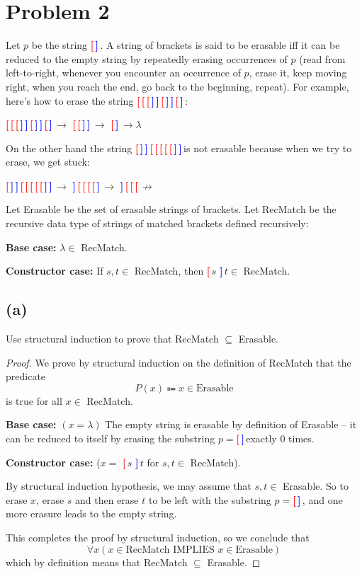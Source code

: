 \documentclass[14pt]{extarticle}
\newcommand{\lbr}{\textcolor{red}{{\bf [\,}}}
\newcommand{\rbr}{\textcolor{blue}{{\bf ]\,}}}
\begin{document}
\section{Problem 2}
Let $p$ be the string \lbr\rbr. A string of brackets is said to be erasable iff it can be reduced to the empty string by repeatedly erasing occurrences of $p$ (read from left-to-right, whenever you encounter an occurrence of $p$, erase it, keep moving right, when you reach the end, go back to the beginning, repeat). For example, here’s how to erase the string \lbr\lbr\lbr\rbr\rbr\lbr\rbr\rbr\lbr\rbr:

\begin{center}
\lbr\lbr\lbr\rbr\rbr\lbr\rbr\rbr\lbr\rbr $\to$ \lbr\lbr\rbr\rbr $\to$ \lbr\rbr $\to\lambda$
\end{center}

On the other hand the string \lbr\rbr\rbr\lbr\lbr\lbr\lbr\lbr\rbr\rbr is not erasable because when we try to erase, we get stuck:

\begin{center}
\lbr\rbr\rbr\lbr\lbr\lbr\lbr\lbr\rbr\rbr $\to$ \rbr\lbr\lbr\lbr\lbr\rbr $\to$ \rbr\lbr\lbr\lbr $\not\to$
\end{center}

Let Erasable be the set of erasable strings of brackets. Let RecMatch be the recursive data type of strings of matched brackets defined recursively:

{\bf Base case:} $\lambda \in$ RecMatch.

{\bf Constructor case:} If $s, t \in$ RecMatch, then \lbr$s$ \rbr$t \in$ RecMatch.

\subsection{(a)}
Use structural induction to prove that RecMatch $\subseteq$ Erasable.
\begin{proof}
We prove by structural induction on the definition of RecMatch that the predicate 
$$
P(x) \Coloneqq x \in \text{Erasable}
$$
is true for all $x \in$ RecMatch.

{\bf Base case:} $(x = \lambda)$ The empty string is erasable by definition of Erasable – it can be reduced to itself by erasing the substring $p =$\lbr\rbr exactly 0 times.

{\bf Constructor case:} ($x = $ \lbr $s$ \rbr $t$ for $s, t \in$ RecMatch). 

By structural induction hypothesis, we may assume that $s, t \in$ Erasable. So to erase $x$, erase $s$ and then erase $t$ to be left with the substring $p =$\lbr\rbr, and one more erasure leads to the empty string.

This completes the proof by structural induction, so we conclude that 
$$
\forall x(x \in \text{RecMatch} \text{ IMPLIES } x \in \text{Erasable})
$$
which by definition means that RecMatch $\subseteq$ Erasable.
\end{proof}
\end{document}

